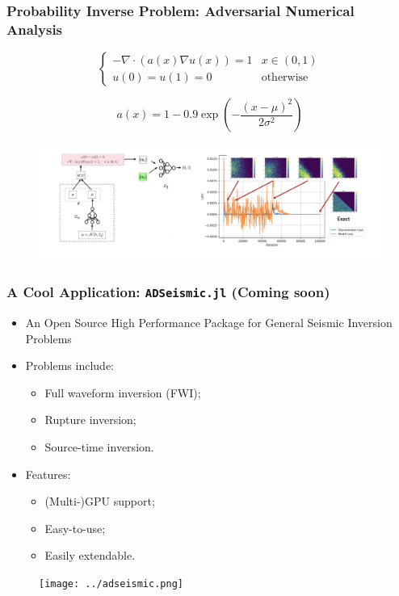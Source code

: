 \documentclass{beamer}
\begin{document}
\begin{frame}
	\frametitle{Probability Inverse Problem: Adversarial Numerical Analysis}
	
		\begin{equation*}
			\begin{cases}     -\nabla \cdot (a(x)\nabla u(x)) = 1 & x\in(0,1)\\
    u(0) = u(1) = 0 & \mbox{otherwise} \end{cases}
		\end{equation*}
		
		\begin{equation*}
			a(x) = 1-0.9\exp\left( -\frac{(x-\mu)^2}{2\sigma^2} \right)
		\end{equation*}

\begin{figure}[hbt]
	 \includegraphics[width=1.0\textwidth]{../ana.png}
\end{figure}
\end{frame}

\begin{frame}
	\frametitle{A Cool Application: \texttt{ADSeismic.jl} (Coming soon)}
	\begin{itemize}
		\item An Open Source High Performance Package for General Seismic Inversion Problems
		\item Problems include:
		\begin{itemize}
		\item Full waveform inversion (FWI);
\item Rupture inversion;
\item Source-time inversion.
		\end{itemize}
		\item Features:
		\begin{itemize}
		\item (Multi-)GPU support;
		\item Easy-to-use;
		\item Easily extendable.
		\end{itemize}
	\end{itemize}
	
	\begin{figure}[hbt]
	 \texttt{[image: ../adseismic.png]}
\end{figure}
\end{frame}


\end{document}
